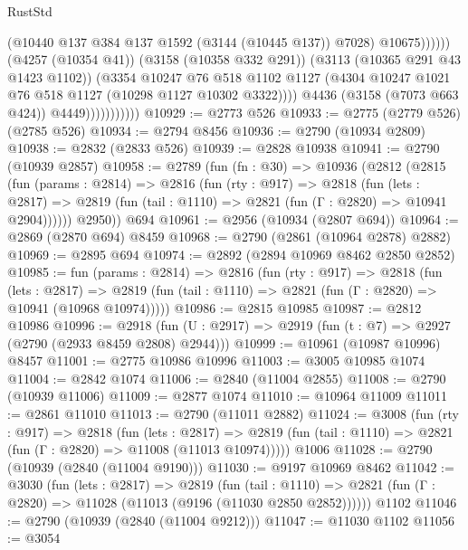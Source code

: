 \begin{lexlean}{RustStd}
\begin{coremodule}
                                        (@10440 @137 @384 @137 @1592 (@3144 (@10445 @137)) @7028)
                                        @10675))))))
                            (@4257 (@10354 @41))
                            (@3158 (@10358 @332 @291))
                            (@3113 (@10365 @291 @43 @1423 @1102))
                            (@3354
                              @10247
                              @76
                              @518
                              @1102
                              @1127
                              (@4304 @10247 @1021 @76 @518 @1127 (@10298 @1127 @10302 @3322))))
                          @4436
                          (@3158 (@7073 @663 @424))
                          @4449)))))))))))
@10929 := @2773 @526
@10933 := @2775 (@2779 @526) (@2785 @526)
@10934 := @2794 @8456
@10936 := @2790 (@10934 @2809)
@10938 := @2832 (@2833 @526)
@10939 := @2828 @10938
@10941 := @2790 (@10939 @2857)
@10958 := @2789
    (fun (fn : @30) =>
    @10936
      (@2812
        (@2815
          (fun (params : @2814) =>
          @2816
            (fun (rty : @917) =>
            @2818
              (fun (lets : @2817) =>
              @2819 (fun (tail : @1110) => @2821 (fun (Γ : @2820) => @10941 @2904))))))
        @2950))
    @694
@10961 := @2956 (@10934 (@2807 @694))
@10964 := @2869 (@2870 @694) @8459
@10968 := @2790 (@2861 (@10964 @2878) @2882)
@10969 := @2895 @694
@10974 := @2892 (@2894 @10969 @8462 @2850 @2852)
@10985 := fun (params : @2814) =>
  @2816
    (fun (rty : @917) =>
    @2818
      (fun (lets : @2817) =>
      @2819 (fun (tail : @1110) => @2821 (fun (Γ : @2820) => @10941 (@10968 @10974)))))
@10986 := @2815 @10985
@10987 := @2812 @10986
@10996 := @2918 (fun (U : @2917) => @2919 (fun (t : @7) => @2927 (@2790 (@2933 @8459 @2808) @2944)))
@10999 := @10961 (@10987 @10996) @8457
@11001 := @2775 @10986 @10996
@11003 := @3005 @10985 @1074
@11004 := @2842 @1074
@11006 := @2840 (@11004 @2855)
@11008 := @2790 (@10939 @11006)
@11009 := @2877 @1074
@11010 := @10964 @11009
@11011 := @2861 @11010
@11013 := @2790 (@11011 @2882)
@11024 := @3008
    (fun (rty : @917) =>
    @2818
      (fun (lets : @2817) =>
      @2819 (fun (tail : @1110) => @2821 (fun (Γ : @2820) => @11008 (@11013 @10974)))))
    @1006
@11028 := @2790 (@10939 (@2840 (@11004 @9190)))
@11030 := @9197 @10969 @8462
@11042 := @3030
    (fun (lets : @2817) =>
    @2819
      (fun (tail : @1110) =>
      @2821 (fun (Γ : @2820) => @11028 (@11013 (@9196 (@11030 @2850 @2852))))))
    @1102
@11046 := @2790 (@10939 (@2840 (@11004 @9212)))
@11047 := @11030 @1102
@11056 := @3054

\end{coremodule}
\end{lexlean}
